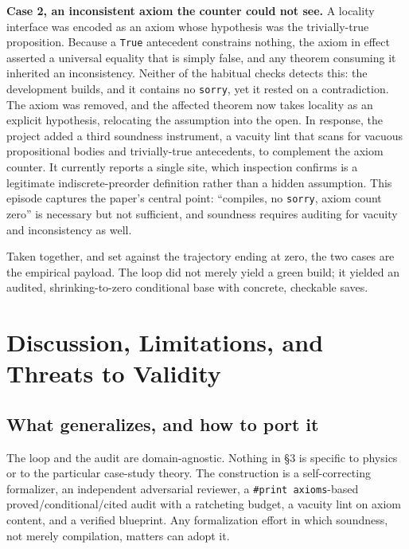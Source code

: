 \documentclass[11pt]{article}
\begin{document}
\textbf{Case 2, an inconsistent axiom the counter could not see.} A locality interface was encoded as
an axiom whose hypothesis was the trivially-true proposition. Because a \texttt{True} antecedent
constrains nothing, the axiom in effect asserted a universal equality that is simply false, and any
theorem consuming it inherited an inconsistency. Neither of the habitual checks detects this: the
development builds, and it contains no \texttt{sorry}, yet it rested on a contradiction. The axiom was
removed, and the affected theorem now takes locality as an explicit hypothesis, relocating the
assumption into the open. In response, the project added a third soundness instrument, a vacuity lint
that scans for vacuous propositional bodies and trivially-true antecedents, to complement the axiom
counter. It currently reports a single site, which inspection confirms is a legitimate
indiscrete-preorder definition rather than a hidden assumption. This episode captures the paper's
central point: ``compiles, no \texttt{sorry}, axiom count zero'' is necessary but not sufficient, and
soundness requires auditing for vacuity and inconsistency as well.

Taken together, and set against the trajectory ending at zero, the two cases are the empirical payload.
The loop did not merely yield a green build; it yielded an audited, shrinking-to-zero conditional base
with concrete, checkable saves.

\section{Discussion, Limitations, and Threats to Validity}

\subsection{What generalizes, and how to port it}

The loop and the audit are domain-agnostic. Nothing in \S3 is specific to physics or to the particular
case-study theory. The construction is a self-correcting formalizer, an independent adversarial
reviewer, a \texttt{\#print axioms}-based proved/conditional/cited audit with a ratcheting budget, a
vacuity lint on axiom content, and a verified blueprint. Any formalization effort in which soundness,
not merely compilation, matters can adopt it.
\end{document}
